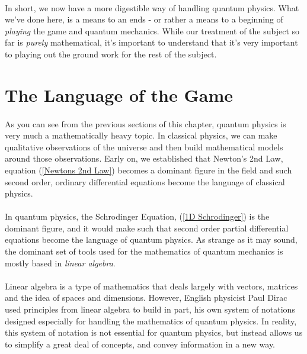 \documentclass[12pt,letterpaper]{book}
\begin{document}
\paragraph*{}In short, we now have a more digestible way of handling quantum physics. What we've done here, is a means to an ends - or rather a means to a beginning of \textit{playing} the game and quantum mechanics. While our treatment of the subject so far is \textit{purely} mathematical, it's important to understand that it's very important to playing out the ground work for the rest of the subject. 


\section{The Language of the Game}

\paragraph*{}As you can see from the previous sections of this chapter, quantum physics is very much a mathematically heavy topic. In classical physics, we can make qualitative observations of the universe and then build mathematical models around those observations. Early on, we established that Newton's 2nd Law, equation (\ref{Newtons 2nd Law}) becomes a dominant figure in the field and such second order, ordinary differential equations become the language of classical physics.

\paragraph*{}In quantum physics, the Schrodinger Equation, (\ref{1D Schrodinger}) is the dominant figure, and it would make such that second order partial differential equations become the language of quantum physics. As strange as it may sound, the dominant set of tools used for the mathematics of quantum mechanics is mostly based in \textit{linear algebra}.

\paragraph*{}Linear algebra is a type of mathematics that deals largely with vectors, matrices and the idea of spaces and dimensions. However, English physicist Paul Dirac used principles from linear algebra to build in part, his own system of notations designed especially for handling the mathematics of quantum physics. In reality, this system of notation is not essential for quantum physics, but instead allows us to simplify a great deal of concepts, and convey information in a new way.
\end{document}
